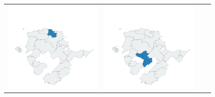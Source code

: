 \begin{figure}
\begin{tabularx}{1\textwidth}{XXXX}
\includegraphics[width=1\linewidth]{images/ch6/loading/15}&
\includegraphics[width=1\linewidth]{images/ch6/loading/16} \\

\end{tabularx}
\end{figure}

